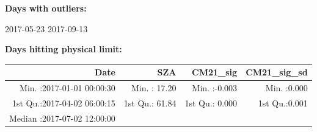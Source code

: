 \documentclass[
  10pt,
  a4paper,oneside]{article}
\begin{document}
\normalsize

\textbf{Days with outliers:}

2017-05-23 2017-09-13

\textbf{Days hitting physical limit:}

\footnotesize

\begin{longtable}[]{@{}rrrr@{}}
\toprule
\begin{minipage}[b]{0.33\columnwidth}\raggedleft
Date\strut
\end{minipage} & \begin{minipage}[b]{0.19\columnwidth}\raggedleft
SZA\strut
\end{minipage} & \begin{minipage}[b]{0.19\columnwidth}\raggedleft
CM21\_sig\strut
\end{minipage} & \begin{minipage}[b]{0.19\columnwidth}\raggedleft
CM21\_sig\_sd\strut
\end{minipage}\tabularnewline
\midrule
\endhead
\begin{minipage}[t]{0.33\columnwidth}\raggedleft
Min. :2017-01-01 00:00:30\strut
\end{minipage} & \begin{minipage}[t]{0.19\columnwidth}\raggedleft
Min. : 17.20\strut
\end{minipage} & \begin{minipage}[t]{0.19\columnwidth}\raggedleft
Min. :-0.003\strut
\end{minipage} & \begin{minipage}[t]{0.19\columnwidth}\raggedleft
Min. :0.000\strut
\end{minipage}\tabularnewline
\begin{minipage}[t]{0.33\columnwidth}\raggedleft
1st Qu.:2017-04-02 06:00:15\strut
\end{minipage} & \begin{minipage}[t]{0.19\columnwidth}\raggedleft
1st Qu.: 61.84\strut
\end{minipage} & \begin{minipage}[t]{0.19\columnwidth}\raggedleft
1st Qu.: 0.000\strut
\end{minipage} & \begin{minipage}[t]{0.19\columnwidth}\raggedleft
1st Qu.:0.001\strut
\end{minipage}\tabularnewline
\begin{minipage}[t]{0.33\columnwidth}\raggedleft
Median :2017-07-02 12:00:00\strut
\end{minipage} & \begin{minipage}[t]{0.19\columnwidth}\raggedleft

\end{minipage}
\end{longtable}
\end{document}
